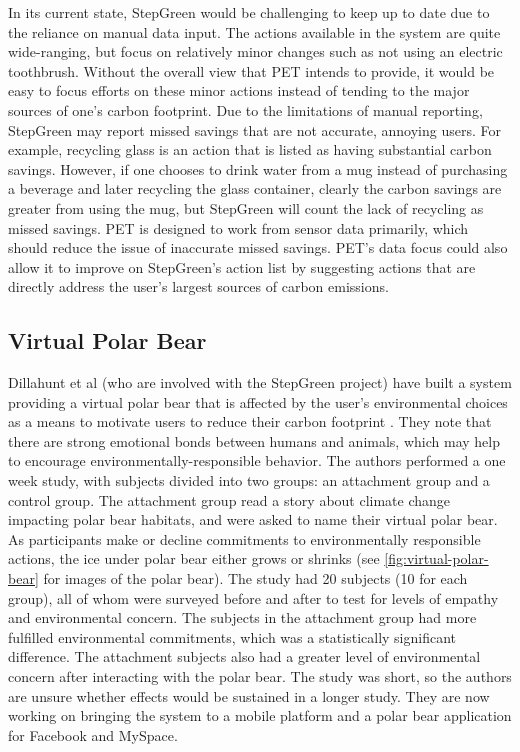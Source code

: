 In its current state, StepGreen would be challenging to keep up to date due to the reliance on manual data input. The actions available in the system are quite wide-ranging, but focus on relatively minor changes such as not using an electric toothbrush. Without the overall view that PET intends to provide, it would be easy to focus efforts on these minor actions instead of tending to the major sources of one's carbon footprint. Due to the limitations of manual reporting, StepGreen may report missed savings that are not accurate, annoying users. For example, recycling glass is an action that is listed as having substantial carbon savings. However, if one chooses to drink water from a mug instead of purchasing a beverage and later recycling the glass container, clearly the carbon savings are greater from using the mug, but StepGreen will count the lack of recycling as missed savings. PET is designed to work from sensor data primarily, which should reduce the issue of inaccurate missed savings. PET's data focus could also allow it to improve on StepGreen's action list by suggesting actions that are directly address the user's largest sources of carbon emissions.

\subsection{Virtual Polar Bear}
\label{virtual-polar-bear}

Dillahunt et al (who are involved with the StepGreen project) have built a system providing a virtual polar bear that is affected by the user's environmental choices as a means to motivate users to reduce their carbon footprint \cite{dillahunt-virtual-polar-bear-2008}. They note that there are strong emotional bonds between humans and animals, which may help to encourage environmentally-responsible behavior. The authors performed a one week study, with subjects divided into two groups: an attachment group and a control group. The attachment group read a story about climate change impacting polar bear habitats, and were asked to name their virtual polar bear. As participants make or decline commitments to environmentally responsible actions, the ice under polar bear either grows or shrinks (see \autoref{fig:virtual-polar-bear} for images of the polar bear). The study had 20 subjects (10 for each group), all of whom were surveyed before and after to test for levels of empathy and environmental concern. The subjects in the attachment group had more fulfilled environmental commitments, which was a statistically significant difference. The attachment subjects also had a greater level of environmental concern after interacting with the polar bear. The study was short, so the authors are unsure whether effects would be sustained in a longer study. They are now working on bringing the system to a mobile platform and a polar bear application for Facebook and MySpace.

